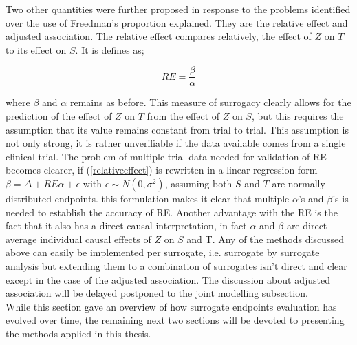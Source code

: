 \documentclass[a4paper,12pt]{article}
\begin{document}
	Two other quantities were further proposed in response to the problems identified over the use of Freedman's proportion explained. They are the relative effect and adjusted association\citep{buyseM4}. The relative effect compares relatively, the effect of $Z$ on $T$ to its effect on $S$. It is defines as;
	
	\begin{equation}\label{relativeeffect}
	RE = \frac{\beta}{\alpha}
	\end{equation}
	
	where $\beta$ and $\alpha$ remains as before. This measure of surrogacy clearly allows for the prediction of the effect of $Z$ on $T$ from the effect of $Z$ on $S$, but this requires the assumption that its value remains constant from trial to trial\citep{wim2016}. This assumption is not only strong, it is rather unverifiable if the data available comes from a single clinical trial. The problem of multiple trial data needed for validation of RE becomes clearer, if (\ref{relativeeffect}) is rewritten in a linear regression form $\beta = \Delta + RE \alpha +\epsilon$ with $\epsilon \sim N(0,\sigma^2)$, assuming both $S$ and $T$ are normally distributed endpoints. this formulation makes it clear that multiple $\alpha$'s and $\beta$'s is needed to establish the accuracy of RE\citep{molenberghs2013}. Another advantage with the RE is the fact that it also has a direct causal interpretation, in fact $\alpha$ and $\beta$ are direct average individual causal effects of $Z$ on $S$ and T\citep{wim2016}.  Any of the methods discussed above can easily be implemented per surrogate, i.e. surrogate by surrogate analysis but extending them to a combination of surrogates isn't direct and clear except in the case of the adjusted association\citep{multivariatesurrogates}. The discussion about adjusted association will be delayed postponed to the joint modelling subsection.\\
	
	While this section gave an overview of how surrogate endpoints evaluation has evolved over time, the remaining next two sections will be devoted to presenting the methods applied in this thesis.
	
\end{document}
